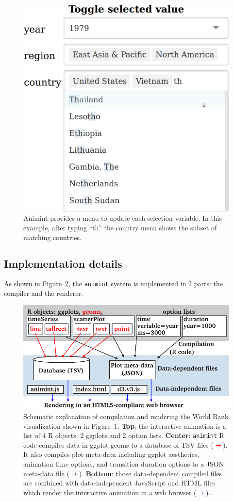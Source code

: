 \documentclass[journal]{vgtc}\usepackage[]{graphicx}\usepackage[]{color}
\begin{document}
\begin{figure}[b!]
  \centering
  \includegraphics[width=0.5\columnwidth]{Screenshot-toggle-selected-value}
  \caption{Animint provides a menu to update each selection
    variable. In this example, after typing ``th'' the country menu
    shows the subset of matching countries.}
  \label{fig:widgets}
\end{figure}

\subsection{Implementation details}
\label{sec:implementation}

As shown in Figure~\ref{fig:design}, the \texttt{animint} system is implemented
in 2 parts: the compiler and the renderer.

\begin{figure}[b!]
  \centering
  \includegraphics[width=\columnwidth]{figure-design}
  \caption{Schematic explanation of compilation and rendering the
    World Bank visualization shown in Figure~1. \textbf{Top}: the
    interactive animation is a list of 4 R objects: 2 ggplots and 2
    option lists. \textbf{Center}: \texttt{animint} R code compiles data in
    ggplot geoms to a database of TSV files
    (\textcolor{red}{$\rightarrowtriangle$}). It also compiles plot
    meta-data including ggplot aesthetics, animation time
    options, and transition duration options to a JSON meta-data file
    ($\rightarrowtriangle$). \textbf{Bottom}: those data-dependent
    compiled files are combined with data-independent JavaScript and
    HTML files which render the interactive animation in a web browser
    (\textcolor{blue}{$\rightarrowtriangle$}).}
  \label{fig:design}
\end{figure}
\end{document}
